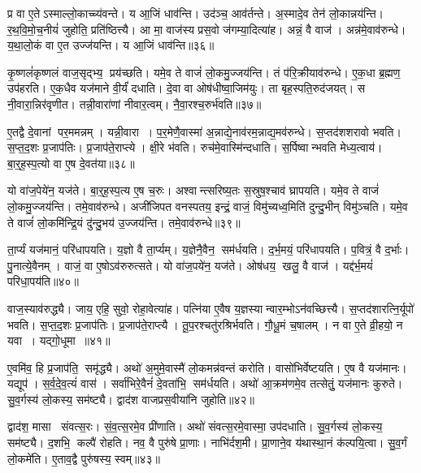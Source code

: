प्र वा ए॒तेऽस्माल्लो॒काच्च्य॑वन्ते। य आ॒जिं धाव॑न्ति। उद॑ञ्च॒ आव॑र्तन्ते। अ॒स्मादे॒व तेन॑ लो॒कान्नय॑न्ति। र॒थ॒वि॒मो॒च॒नीयं॑ जुहोति॒ प्रति॑ष्ठित्त्यै। आ मा॒ वाज॑स्य प्रस॒वो ज॑गम्या॒दित्या॑ह। अन्नं॒ वै वाज॑। अन्न॑मे॒वाव॑रुन्धे। य॒था॒लो॒कं वा ए॒त उज्ज॑यन्ति। य आ॒जिं धाव॑न्ति॥३६॥

कृ॒ष्णलं॑कृष्णलं वाज॒सृद्भ्य॒ प्रय॑च्छति। यमे॒व ते वाजं॑ लो॒कमु॒ज्जय॑न्ति। तं प॑रि॒क्रीयाव॑रुन्धे। ए॒क॒धा ब्र॒ह्मण॒ उप॑हरति। ए॒क॒धैव यज॑माने वी॒र्यं॑ दधाति। दे॒वा वा ओष॑धीष्वा॒जिम॑युः। ता बृह॒स्पति॒रुद॑जयत्। स नी॒वारा॒न्निर॑वृणीत। तन्नी॒वारा॑णां नीवार॒त्वम्। नै॒वा॒रश्च॒रुर्भ॑वति॥३७॥

ए॒तद्वै दे॒वानां पर॒ममन्नम्। यन्नी॒वारा। प॒र॒मेणै॒वास्मा॑ अ॒न्नाद्ये॒नाव॑रम॒न्नाद्य॒मव॑रुन्धे। स॒प्तद॑शशरावो भवति। स॒प्त॒द॒शः प्र॒जाप॑तिः। प्र॒जाप॑ते॒राप्त्ये। क्षी॒रे भ॑वति। रुच॑मे॒वास्मि॑न्दधाति। स॒र्पिष्वान्भवति मेध्य॒त्वाय॑। बा॒र्॒ह॒स्प॒त्यो वा ए॒ष दे॒वत॑या॥३८॥

यो वा॑ज॒पेये॑न॒ यज॑ते। बा॒र्॒ह॒स्प॒त्य ए॒ष च॒रुः। अश्वान्त्सरिष्य॒तः स॒स्रुष॒श्चाव॑ घ्रापयति। यमे॒व ते वाजं॑ लो॒कमु॒ज्जय॑न्ति। तमे॒वाव॑रुन्धे। अजी॑जिपत वनस्पतय॒ इन्द्रं॒ वाजं॒ विमु॑च्यध्व॒मिति॑ दुन्दु॒भीन् विमु॑ञ्चति। यमे॒व ते वाजं॑ लो॒कमि॑न्द्रि॒यं दु॑न्दु॒भय॑ उ॒ज्जय॑न्ति। तमे॒वाव॑रुन्धे॥३९॥

ता॒र्प्यं यज॑मानं॒ परि॑धापयति। य॒ज्ञो वै ता॒र्प्यम्। य॒ज्ञेनै॒वैन॒ सम॑र्धयति। द॒र्भ॒मयं॒ परि॑धापयति। प॒वित्रं॒ वै द॒र्भाः। पु॒नात्ये॒वैनम्। वाजं॒ वा ए॒षोऽव॑रुरुत्सते। यो वा॑ज॒पये॑न॒ यज॑ते। ओष॑धय॒ खलु॒ वै वाज॑। यद्द॑र्भ॒मयं॑ परिधा॒पय॑ति॥४०॥

वाज॒स्याव॑रुद्ध्यै। जाय॒ एहि॒ सुवो॒ रोहा॒वेत्या॑ह। पत्नि॑या ए॒वैष य॒ज्ञस्यान्वार॒म्भोऽन॑वच्छित्त्यै। स॒प्तद॑शारत्नि॒र्यूपो॑ भवति। स॒प्त॒द॒शः प्र॒जाप॑तिः। प्र॒जाप॑ते॒राप्त्यै। तू॒प॒रश्चतु॑रश्रिर्भवति। गौ॒धू॒मं च॒षालम्। न वा ए॒ते व्री॒हयो॒ न यवा। यद्गो॒धूमा॥४१॥

ए॒वमि॑व॒ हि प्र॒जाप॑ति॒ समृ॑द्ध्यै। अथो॑ अ॒मुमे॒वास्मै॑ लो॒कमन्न॑वन्तं करोति। वासो॑भिर्वेष्टयति। ए॒ष वै यज॑मानः। यद्यूप॑। स॒र्व॒दे॒व॒त्यं॑ वास॑। सर्वा॑भिरे॒वैनं॑ दे॒वता॑भि॒ सम॑र्धयति। अथो॑ आ॒क्रम॑णमे॒व तत्सेतुं॒ यज॑मानः कुरुते। सु॒व॒र्गस्य॑ लो॒कस्य॒ सम॑ष्ट्यै। द्वाद॑श वाजप्रस॒वीया॑नि जुहोति॥४२॥

द्वाद॑श॒ मासा संवत्स॒रः। सं॒व॒त्स॒रमे॒व प्री॑णाति। अथो॑ संवत्स॒रमे॒वास्मा॒ उप॑दधाति। सु॒व॒र्गस्य॑ लो॒कस्य॒ सम॑ष्ट्यै। द॒शभि॒ कल्पै॑ रोहति। नव॒ वै पुरु॑षे प्रा॒णाः। नाभि॑र्दश॒मी। प्रा॒णाने॒व य॑थास्था॒नं क॑ल्पयि॒त्वा। सु॒व॒र्गं लो॒कमे॑ति। ए॒ताव॒द्वै पुरु॑षस्य॒ स्वम्॥४३॥

